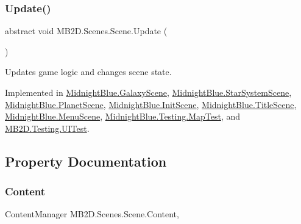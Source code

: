 \subsubsection{\texorpdfstring{Update()}{Update()}}
{\footnotesize\ttfamily abstract void M\+B2\+D.\+Scenes.\+Scene.\+Update (\begin{DoxyParamCaption}{ }\end{DoxyParamCaption})\hspace{0.3cm}{\ttfamily [pure virtual]}}



Updates game logic and changes scene state. 



Implemented in \hyperlink{class_midnight_blue_1_1_galaxy_scene_a9dfa66406143ed20f4d534c768f05a78}{Midnight\+Blue.\+Galaxy\+Scene}, \hyperlink{class_midnight_blue_1_1_star_system_scene_ac36506b721064e015a9f93140681d93a}{Midnight\+Blue.\+Star\+System\+Scene}, \hyperlink{class_midnight_blue_1_1_planet_scene_add0a85b4f754f026231aa7269259c65c}{Midnight\+Blue.\+Planet\+Scene}, \hyperlink{class_midnight_blue_1_1_init_scene_ad87861fb4f2a30f5168f6133aa10d3f4}{Midnight\+Blue.\+Init\+Scene}, \hyperlink{class_midnight_blue_1_1_title_scene_a4052b2a261434462cd0150e2f4da3c5b}{Midnight\+Blue.\+Title\+Scene}, \hyperlink{class_midnight_blue_1_1_menu_scene_af82ad49ba2744422e52fc6c1b8544255}{Midnight\+Blue.\+Menu\+Scene}, \hyperlink{class_midnight_blue_1_1_testing_1_1_map_test_ae4bb817dd9c5b55bd1d818de9f527c7c}{Midnight\+Blue.\+Testing.\+Map\+Test}, and \hyperlink{class_m_b2_d_1_1_testing_1_1_u_i_test_a547d5592fee47d4c9354ee8f307c8813}{M\+B2\+D.\+Testing.\+U\+I\+Test}.



\subsection{Property Documentation}
\hypertarget{class_m_b2_d_1_1_scenes_1_1_scene_a8d5434f75a273135d8bae9ce36cc69ee}{}\label{class_m_b2_d_1_1_scenes_1_1_scene_a8d5434f75a273135d8bae9ce36cc69ee} 
\subsubsection{\texorpdfstring{Content}{Content}}
{\footnotesize\ttfamily Content\+Manager M\+B2\+D.\+Scenes.\+Scene.\+Content\hspace{0.3cm}{\ttfamily [get]}, {\ttfamily [protected]}}



